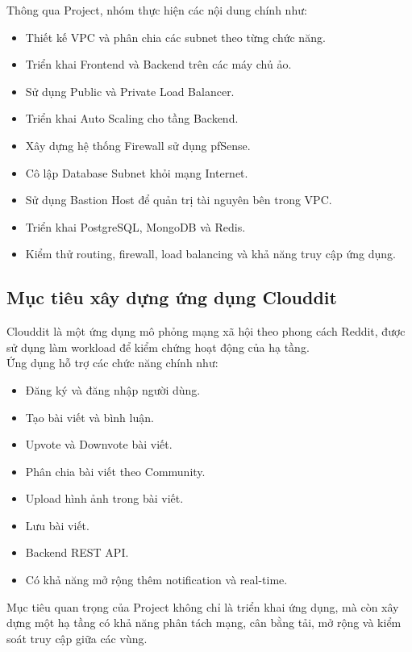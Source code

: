 \documentclass[12pt, a4paper]{article}
\begin{document}
\noindent Thông qua Project, nhóm thực hiện các nội dung chính như:

\begin{itemize}
    \item Thiết kế VPC và phân chia các subnet theo từng chức năng.
    \item Triển khai Frontend và Backend trên các máy chủ ảo.
    \item Sử dụng Public và Private Load Balancer.
    \item Triển khai Auto Scaling cho tầng Backend.
    \item Xây dựng hệ thống Firewall sử dụng pfSense.
    \item Cô lập Database Subnet khỏi mạng Internet.
    \item Sử dụng Bastion Host để quản trị tài nguyên bên trong VPC.
    \item Triển khai PostgreSQL, MongoDB và Redis.
    \item Kiểm thử routing, firewall, load balancing và khả năng truy cập ứng dụng.
\end{itemize}

\subsection{Mục tiêu xây dựng ứng dụng Clouddit}

Clouddit là một ứng dụng mô phỏng mạng xã hội theo phong cách Reddit,
được sử dụng làm workload để kiểm chứng hoạt động của hạ tầng. \\

\noindent Ứng dụng hỗ trợ các chức năng chính như:

\begin{itemize}
    \item Đăng ký và đăng nhập người dùng.
    \item Tạo bài viết và bình luận.
    \item Upvote và Downvote bài viết.
    \item Phân chia bài viết theo Community.
    \item Upload hình ảnh trong bài viết.
    \item Lưu bài viết.
    \item Backend REST API.
    \item Có khả năng mở rộng thêm notification và real-time.
\end{itemize}

\noindent Mục tiêu quan trọng của Project không chỉ là triển khai ứng dụng, mà còn xây dựng một hạ tầng có khả năng phân tách mạng, cân bằng tải, mở rộng và kiểm soát truy cập giữa các vùng.
\end{document}
